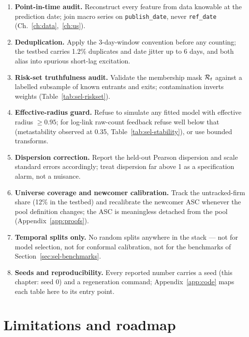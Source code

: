 \begin{enumerate}
\item \textbf{Point-in-time audit.} Reconstruct every feature from data knowable at the prediction date;
join macro series on \texttt{publish\_date}, never \texttt{ref\_date} (Ch.~\ref{ch:data},~\ref{ch:us}).
\item \textbf{Deduplication.} Apply the 3-day-window convention before any counting; the testbed carries
1.2\% duplicates and date jitter up to 6 days, and both alias into spurious short-lag excitation.
\item \textbf{Risk-set truthfulness audit.} Validate the membership mask $\mathcal{R}_t$ against a labelled
subsample of known entrants and exits; contamination inverts weights (Table~\ref{tab:sel-riskset}).
\item \textbf{Effective-radius guard.} Refuse to simulate any fitted model with effective radius $\ge 0.95$;
for log-link raw-count feedback refuse well below that (metastability observed at 0.35,
Table~\ref{tab:sel-stability}), or use bounded transforms.
\item \textbf{Dispersion correction.} Report the held-out Pearson dispersion and scale standard errors
accordingly; treat dispersion far above 1 as a specification alarm, not a nuisance.
\item \textbf{Universe coverage and newcomer calibration.} Track the untracked-firm share (12\% in the
testbed) and recalibrate the newcomer ASC whenever the pool definition changes; the ASC is meaningless
detached from the pool (Appendix~\ref{app:proofs}).
\item \textbf{Temporal splits only.} No random splits anywhere in the stack --- not for model selection, not
for conformal calibration, not for the benchmarks of Section~\ref{sec:sel-benchmarks}.
\item \textbf{Seeds and reproducibility.} Every reported number carries a seed (this chapter: seed 0) and a
regeneration command; Appendix~\ref{app:code} maps each table here to its entry point.
\end{enumerate}

\section{Limitations and roadmap}
\label{sec:sel-limits}

